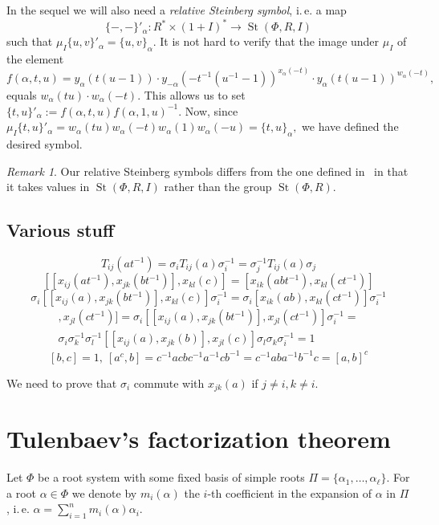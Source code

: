 \documentclass[oneside, 10pt]{amsart}
\DeclareMathOperator{\St}{St}
\newcommand{\ext}[1]{\mu_{#1}}           %
\numberwithin{equation}{section}
\numberwithin{lemma}{section}
\theoremstyle{definition}
\theoremstyle{remark}
\newtheorem{rem}[lemma]{Remark}
\begin{document}
In the sequel we will also need a {\it relative Steinberg symbol}, i.\,e. a map
\begin{equation*} \{-, -\}'_\alpha \colon R^* \times (1 + I)^* \to \St(\Phi, R, I) \end{equation*}
such that $ \ext{I} \{u, v\}'_\alpha = \{u, v\}_\alpha$. It is not hard to verify that the image under $\mu_I$ of the element
\begin{equation*} f(\alpha, t, u)= y_\alpha(t(u-1)) \cdot y_{-\alpha}(-t^{-1}(u^{-1}-1))^{x_\alpha(-t)} \cdot y_{\alpha}(t(u-1))^{w_\alpha(-t)}, \end{equation*}
equals $w_\alpha(tu) \cdot w_\alpha(-t)$. This allows us to set $\{t, u \}'_\alpha := f(\alpha, t, u) f(\alpha, 1, u)^{-1}.$
Now, since $\mu_I\{ t, u \}'_\alpha = w_\alpha(tu) w_\alpha(-t) w_\alpha(1) w_\alpha(-u) = \{t, u\}_\alpha,$ 
 we have defined the desired symbol.
\begin{rem}
 Our relative Steinberg symbols differs from the one defined in~\cite{Ste73} in that
  it takes values in $\St(\Phi, R, I)$ rather than the group $\St(\Phi, R)$. %
\end{rem}

\subsection{Various stuff}
\[ T_{ij}(at^{-1}) = \sigma_i T_{ij}(a) \sigma_i^{-1} = \sigma_j^{-1} T_{ij}(a) \sigma_j \]
\[ [[x_{ij}(a t^{-1}), x_{jk}(b t^{-1})],  x_{kl}(c)] = [x_{ik}(a b t^{-1}),  x_{kl}(c t^{-1})] \]
\[ \sigma_i [[x_{ij}(a), x_{jk}(b t^{-1})],  x_{kl}(c)] \sigma_i^{-1} =  \sigma_i [x_{ik}(a b),  x_{kl}(c t^{-1})] \sigma_i^{-1} \]
\begin{multline}
[[x_{ij}(at^{-1}), x_{jk}(bt^{-1})], x_{jl}(ct^{-1})] = \sigma_i [[ x_{ij}(a), x_{jk}(bt^{-1})], x_{jl}(ct^{-1})] \sigma_i^{-1} = \\
\sigma_i \sigma_k^{-1} \sigma_l^{-1} [[ x_{ij}(a), x_{jk}(b)], x_{jl}(c)] \sigma_l \sigma_k \sigma_i^{-1} = 1
\end{multline}
\[ [b, c] =1,\ [a^c, b] = c^{-1} a c b c^{-1} a^{-1} c b^{-1} =  c^{-1} a b  a^{-1} b^{-1} c = [a, b]^c \]

We need to prove that $\sigma_i$ commute with $x_{jk}(a)$ if $j\neq i, k \neq i$.


\section{Tulenbaev's factorization theorem}
Let $\Phi$ be a root system with some fixed basis of simple roots $\Pi = \{\alpha_1, \ldots, \alpha_\ell\}$.
For a root $\alpha\in\Phi$ we denote by $m_i(\alpha)$ the $i$-th coefficient in the expansion of $\alpha$ in $\Pi$,
 i.\,e. $\alpha = \sum_{i=1}^n m_i(\alpha) \alpha_i$.
\end{document}
